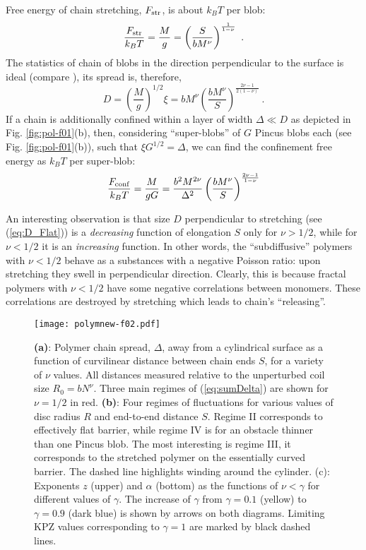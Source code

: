 \documentclass[aps,pre,floatfix,twocolumn,nofootinbib]{revtex4-2}
\newcommand{\be}{\begin{equation}}
\newcommand{\ee}{\end{equation}}
\newcommand{\eq}[1]{(\ref{#1})}
\begin{document}
Free energy of chain stretching, $F_{\rm str}$, is about $k_B T$ per blob:
\be
\frac{F_{\rm str}}{k_B T} = \frac{M}{g} = \left( \frac{S}{b M^{\nu}} \right)^{\frac{1}{1-\nu}} \ .
\label{eq:FreeEnergy_Stretch}
\ee
The statistics of chain of blobs in the direction perpendicular to the surface is ideal (compare \cite[Equation 1.50]{deGennes}), its spread is, therefore,
\be
D = \left(\frac{M}{g} \right)^{1/2} \xi = b M^{\nu} \left( \frac{b M^{\nu}}{S} \right)^{\frac{2 \nu - 1}{2 (1-\nu)}} \ .
\label{eq:D_Flat}
\ee
If a chain is additionally confined within a layer of width $\Delta \ll D$ as depicted in Fig. \ref{fig:pol-f01}(b), then, considering ``super-blobs'' of $G$ Pincus blobs each (see Fig. \ref{fig:pol-f01}(b)), such that $\xi G^{1/2} = \Delta$, we can find the confinement free energy as $k_BT$ per super-blob:
\be
\frac{F_{\rm conf}}{k_B T} = \frac{M}{gG} = \frac{b^2 M^{2\nu}}{\Delta^2} \left( \frac{b M^{\nu}}{S} \right)^{\frac{2 \nu -1}{1-\nu}}
\label{eq:FreeEnergy_Conf}
\ee


An interesting observation is that size $D$ perpendicular to stretching (see \eq{eq:D_Flat}) is a \textit{decreasing} function of elongation $S$ only for $\nu > 1/2$, while for $\nu < 1/2$ it is an \textit{increasing} function. In other words, the ``subdiffusive'' polymers with $\nu < 1/2$ behave as a substances with a negative Poisson ratio: upon stretching they swell in perpendicular direction. Clearly, this is because fractal polymers with $\nu < 1/2$ have some negative correlations between monomers. These correlations are destroyed by stretching which leads to chain's ``releasing''.

\begin{figure*}
  \centering
  \texttt{[image: polymnew-f02.pdf]}
  \caption{\textbf{(a)}: Polymer chain spread, $\Delta$, away from a cylindrical surface as a function of curvilinear distance between chain ends $S$, for a variety of $\nu$ values.  All distances measured relative to the unperturbed coil size $R_0 = b N^{\nu}$. Three main regimes of \eq{eq:sumDelta} are shown for $\nu=1/2$ in red.  \textbf{(b)}: Four regimes of fluctuations for various values of disc radius $R$ and end-to-end distance $S$. Regime II corresponds to effectively flat barrier, while regime IV is for an obstacle thinner than one Pincus blob.  The most interesting is regime III, it corresponds to the stretched polymer on the essentially curved barrier. The dashed line highlights winding around the cylinder. (c): Exponents $z$ (upper) and $\alpha$ (bottom) as the functions of $\nu <\gamma$ for different values of $\gamma$. The increase of $\gamma$ from $\gamma=0.1$ (yellow) to $\gamma=0.9$ (dark blue) is shown by arrows on both diagrams. Limiting KPZ values corresponding to $\gamma=1$ are marked by black dashed lines.}
  \label{fig:pol-f02}
\end{figure*}
\end{document}
